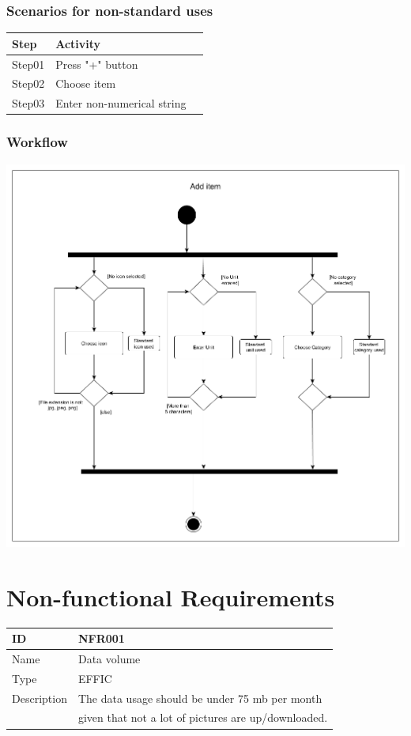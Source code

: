 \documentclass[12pt]{article}
\theoremstyle{definition}
\begin{document}
\subsubsection{Scenarios for non-standard uses}

\begin{tabular}{|l|l|l|}
\hline
Step & Activity \\ \hline
Step01 & Press "+" button \\ \hline
Step02 & Choose item \\ \hline
Step03 & Enter non-numerical string \\ \hline
\end{tabular}

\subsubsection{Workflow}

\includegraphics[scale=.5]{Images/ActivityAddItem.png}

\pagebreak

\section{Non-functional Requirements}

\begin{flushleft}
  \begin{tabular}{|l|L{10cm}|}
  \hline
  ID & NFR001\\ \hline
  Name & Data volume \\ \hline
  Type &  EFFIC\\ \hline
  Description & The data usage should be under 75 mb per month \\
  & given that not a lot of pictures are up/downloaded. \\ \hline
  \end{tabular}
\end{flushleft}
\end{document}
